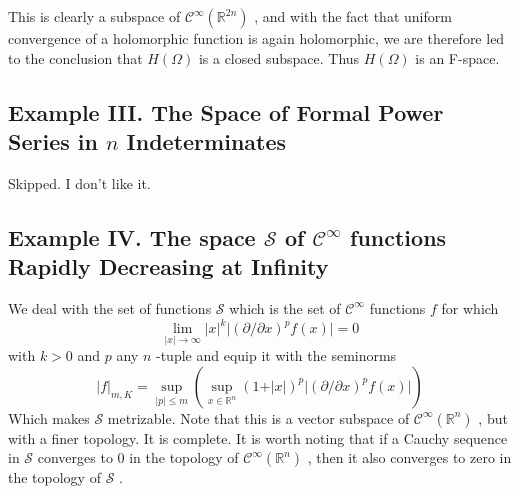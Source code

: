 This is clearly a subspace of $ \mathcal{C}^{ \infty } ( \mathbb{R}^{ 2n } ) $ , and with the fact that uniform convergence of a holomorphic function is again holomorphic, we are therefore led to the conclusion that $ H( \Omega ) $ is a closed subspace. Thus $ H( \Omega ) $ is an F-space.

\subsection{Example III. The Space of Formal Power Series in $ n $ Indeterminates}

Skipped.  I don't like it. 

\subsection{Example IV. The space $ \mathscr{S} $ of $ \mathcal{C}^{ \infty } $ functions Rapidly Decreasing at Infinity}

We deal with the set of functions $ \mathscr{S} $ which is the set of $ \mathcal{C}^{ \infty } $ functions $ f $ for which
\[
	\lim_{ \vert x \vert \to \infty } \vert x \vert^{ k } \vert ( \partial / \partial x )^{ p } f(x) \vert = 0
\]
with $ k > 0 $ and $ p $ any $ n $ -tuple and equip it with the seminorms
\[
	\vert f \vert_{ m,K } = \sup_{ \vert p \vert \leq m } \left( \sup_{ x \in \mathbb{R}^{ n } } (1 + \vert x \vert  )^{ p } \vert (\partial / \partial x)^{ p } f(x) \vert \right)
\]
Which makes $ \mathscr{S} $ metrizable. Note that this is a vector subspace of $ \mathcal{C}^{ \infty } ( \mathbb{R}^{ n } ) $ , but with a finer topology. It is complete. It is worth noting that if a Cauchy sequence in $ \mathscr{S} $ converges to 0 in the topology of $ \mathcal{C}^{ \infty } ( \mathbb{R}^{ n } ) $ , then it also converges to zero in the topology of $ \mathscr{S} $ .
